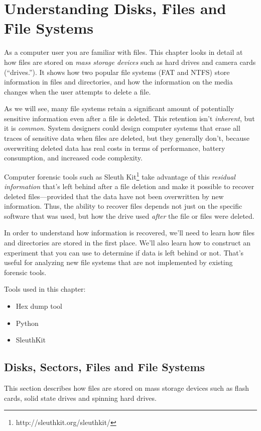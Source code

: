 \chapter{Understanding Disks, Files and File Systems}
As a computer user you are familiar with files. This chapter looks in
detail at how files are stored on \emph{mass storage devices} such as
hard drives and camera cards (``drives.''). It shows how two popular file systems
(FAT and NTFS) store information in files and directories, and how the
information on the media changes when the user attempts to delete a
file.

As we will see, many file systems retain a significant amount of
potentially sensitive information even after a file is deleted. This
retention isn't \emph{inherent}, but it is \emph{common}. 
System designers could design computer systems that erase all traces of
sensitive data when files are deleted, but they generally don't, because
overwriting deleted data has real costs in terms of performance,
battery consumption, and increased code complexity.

Computer forensic tools such as Sleuth
Kit\footnote{http://sleuthkit.org/sleuthkit/} take advantage of this
\emph{residual information} that's left behind after a file deletion
and make it possible to recover deleted files---provided that the data
have not been overwritten by new information. Thus, the ability to
recover files depends not just on the specific software that
was used, but how the drive used \emph{after} the file or files were
deleted.   

In order to understand how information is recovered,
we'll need to learn how files and directories are stored in the first
place. We'll also learn how to construct an experiment that you can
use to determine if data is left behind or not. That's useful for
analyzing new file systems that are not implemented by existing
forensic tools.

Tools used in this chapter:
\begin{itemize}
\item Hex dump tool
\item Python
\item SleuthKit 
\end{itemize}

\section{Disks, Sectors, Files and File Systems}
This section describes how files are stored on mass storage devices
such as flash cards, solid state drives and spinning hard drives. 


